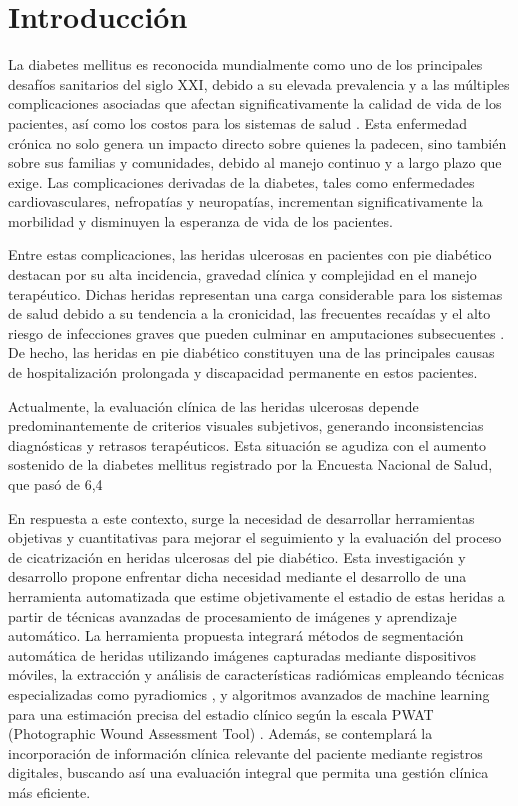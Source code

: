 
\section{Introducción}
\label{sec:Intr}
La diabetes mellitus es reconocida mundialmente como uno de los principales desafíos sanitarios del siglo XXI, debido a su elevada prevalencia y a las múltiples complicaciones asociadas que afectan significativamente la calidad de vida de los pacientes, así como los costos para los sistemas de salud \cite{ministerio2022estrategia}. Esta enfermedad crónica no solo genera un impacto directo sobre quienes la padecen, sino también sobre sus familias y comunidades, debido al manejo continuo y a largo plazo que exige. Las complicaciones derivadas de la diabetes, tales como enfermedades cardiovasculares, nefropatías y neuropatías, incrementan significativamente la morbilidad y disminuyen la esperanza de vida de los pacientes.

Entre estas complicaciones, las heridas ulcerosas en pacientes con pie diabético destacan por su alta incidencia, gravedad clínica y complejidad en el manejo terapéutico. Dichas heridas representan una carga considerable para los sistemas de salud debido a su tendencia a la cronicidad, las frecuentes recaídas y el alto riesgo de infecciones graves que pueden culminar en amputaciones subsecuentes \cite{mishra2017diabetic,bandyk2018diabetic}. De hecho, las heridas en pie diabético constituyen una de las principales causas de hospitalización prolongada y discapacidad permanente en estos pacientes.

Actualmente, la evaluación clínica de las heridas ulcerosas depende predominantemente de criterios visuales subjetivos, generando inconsistencias diagnósticas y retrasos terapéuticos. Esta situación se agudiza con el aumento sostenido de la diabetes mellitus registrado por la Encuesta Nacional de Salud, que pasó de 6,4%

En respuesta a este contexto, surge la necesidad de desarrollar herramientas objetivas y cuantitativas para mejorar el seguimiento y la evaluación del proceso de cicatrización en heridas ulcerosas del pie diabético. Esta investigación y desarrollo propone enfrentar dicha necesidad mediante el desarrollo de una herramienta automatizada que estime objetivamente el estadio de estas heridas a partir de técnicas avanzadas de procesamiento de imágenes y aprendizaje automático. La herramienta propuesta integrará métodos de segmentación automática de heridas utilizando imágenes capturadas mediante dispositivos móviles, la extracción y análisis de características radiómicas empleando técnicas especializadas como pyradiomics \cite{van2017computational}, y algoritmos avanzados de machine learning para una estimación precisa del estadio clínico según la escala PWAT (Photographic Wound Assessment Tool) \cite{thompson2013reliability}. Además, se contemplará la incorporación de información clínica relevante del paciente mediante registros digitales, buscando así una evaluación integral que permita una gestión clínica más eficiente.

